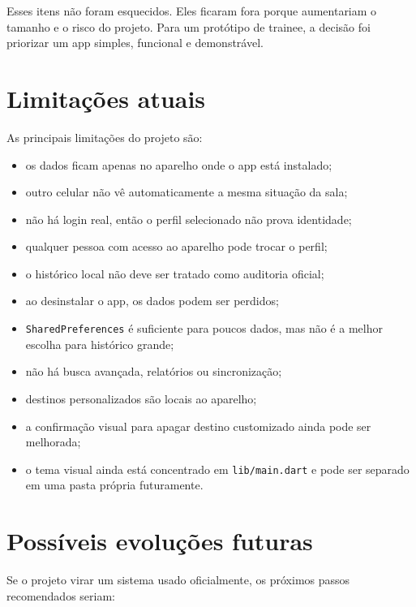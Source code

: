 \documentclass[12pt,a4paper]{article}
\begin{document}
Esses itens não foram esquecidos. Eles ficaram fora porque aumentariam o tamanho e o risco do projeto. Para um protótipo de trainee, a decisão foi priorizar um app simples, funcional e demonstrável.

\section{Limitações atuais}

As principais limitações do projeto são:

\begin{itemize}
    \item os dados ficam apenas no aparelho onde o app está instalado;
    \item outro celular não vê automaticamente a mesma situação da sala;
    \item não há login real, então o perfil selecionado não prova identidade;
    \item qualquer pessoa com acesso ao aparelho pode trocar o perfil;
    \item o histórico local não deve ser tratado como auditoria oficial;
    \item ao desinstalar o app, os dados podem ser perdidos;
    \item \texttt{SharedPreferences} é suficiente para poucos dados, mas não é a melhor escolha para histórico grande;
    \item não há busca avançada, relatórios ou sincronização;
    \item destinos personalizados são locais ao aparelho;
    \item a confirmação visual para apagar destino customizado ainda pode ser melhorada;
    \item o tema visual ainda está concentrado em \texttt{lib/main.dart} e pode ser separado em uma pasta própria futuramente.
\end{itemize}

\section{Possíveis evoluções futuras}

Se o projeto virar um sistema usado oficialmente, os próximos passos recomendados seriam:
\end{document}
